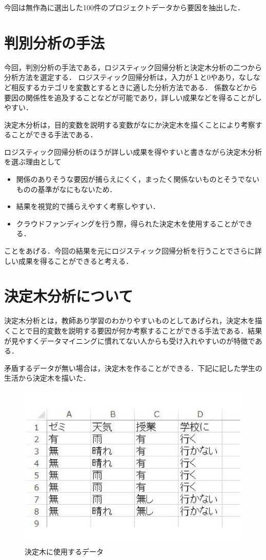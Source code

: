 今回は無作為に選出した100件のプロジェクトデータから要因を抽出した．

\section{判別分析の手法}

今回，判別分析の手法である，ロジスティック回帰分析と決定木分析の二つから分析方法を選定する．
ロジスティック回帰分析は，入力が１と0やあり，なしなど相反するカテゴリを変数とするときに適した分析方法である．
係数などから要因の関係性を追及することなどが可能であり，詳しい成果などを得ることがしやすい．

決定木分析は，目的変数を説明する変数がなにか決定木を描くことにより考察することができる手法である．

ロジスティック回帰分析のほうが詳しい成果を得やすいと書きながら決定木分析を選ぶ理由として
\begin{itemize}
\item 関係のありそうな要因が捕らえにくく，まったく関係ないものとそうでないものの基準がなにもないため．
 \item 結果を視覚的で捕らえやすく考察しやすい．
 \item クラウドファンディングを行う際，得られた決定木を使用することができる．

\end{itemize}

ことをあげる．今回の結果を元にロジスティック回帰分析を行うことでさらに詳しい成果を得ることができると考える．

\section{決定木分析について}

決定木分析とは，教師あり学習のわかりやすいものとしてあげられ，決定木を描くことで目的変数を説明する要因が何か考察することができる手法である．結果が見やすくデータマイニングに慣れてない人からも受け入れやすいのが特徴である．

矛盾するデータが無い場合は，決定木を作ることができる．下記に記した学生の生活から決定木を描いた．

\begin{figure}[H]
\centering
\includegraphics[width=13cm]{figure47.pdf}
\caption{決定木に使用するデータ}\label{sannp}
\end{figure}

